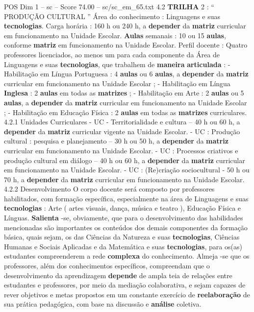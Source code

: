\begin{textsample}{POS Dim 1 – sc – Score 74.00 – sc/sc\_em\_65.txt}  \label{ex:f1_pos_010}
4.2 \textbf{TRILHA} 2 : “ PRODUÇÃO CULTURAL ” Área do conhecimento : Linguagens e suas \textbf{tecnologias}.
Carga horária : 160 h ou 240 h, a \textbf{depender} da \textbf{matriz} curricular em funcionamento na Unidade Escolar. \textbf{Aulas} semanais : 10 ou 15 \textbf{aulas}, conforme \textbf{matriz} em funcionamento na Unidade Escolar.
Perfil docente : Quatro professores licenciados, ao menos um para cada componente da Área de Linguagens e suas \textbf{tecnologias}, que trabalhem de \textbf{maneira} \textbf{articulada} : - Habilitação em Língua Portuguesa : 4 \textbf{aulas} ou 6 \textbf{aulas}, a \textbf{depender} da \textbf{matriz} curricular em funcionamento na Unidade Escolar ; - Habilitação em Língua \textbf{Inglesa} : 2 \textbf{aulas} em todas as \textbf{matrizes} ; - Habilitação em Arte : 2 \textbf{aulas} ou 5 \textbf{aulas}, a \textbf{depender} da \textbf{matriz} curricular em funcionamento na Unidade Escolar ; - Habilitação em Educação Física : 2 \textbf{aulas} em todas as \textbf{matrizes} curriculares. 4.2.1 Unidades Curriculares - UC - Territorialidade e cultura – 40 h ou 60 h, a \textbf{depender} da \textbf{matriz} curricular vigente na Unidade Escolar. - UC : Produção cultural : pesquisa e planejamento – 30 h ou 50 h, a \textbf{depender} da \textbf{matriz} curricular em funcionamento na Unidade Escolar. - UC : Processos criativos e produção cultural em diálogo – 40 h ou 60 h, a \textbf{depender} da \textbf{matriz} curricular em funcionamento na Unidade Escolar. - UC : (Re)criação sociocultural - 50 h ou 70 h, a \textbf{depender} da \textbf{matriz} curricular em funcionamento na Unidade Escolar. 4.2.2 Desenvolvimento O corpo docente será composto por professores habilitados, com formação específica, especialmente na área de Linguagens e suas \textbf{tecnologias} : Arte ( artes visuais, dança, música e teatro ), Educação Física e Línguas. \textbf{Salienta} -se, obviamente, que para o desenvolvimento das habilidades mencionadas são importantes os conteúdos dos demais componentes da formação básica, quais sejam, os das Ciências da Natureza e suas \textbf{tecnologias}, Ciências Humanas e Sociais Aplicadas e da Matemática e suas \textbf{tecnologias}, para os(as) estudantes compreenderem a rede \textbf{complexa} do conhecimento.
Almeja -se que os professores, além dos conhecimentos específicos, compreendam que o desenvolvimento da aprendizagem \textbf{depende} de ampla teia de relações entre estudantes e professores, por meio da mediação colaborativa, e sejam capazes de rever objetivos e metas propostos em um constante exercício de \textbf{reelaboração} de sua prática pedagógica, com base na discussão e \textbf{análise} coletiva.

\end{textsample}
